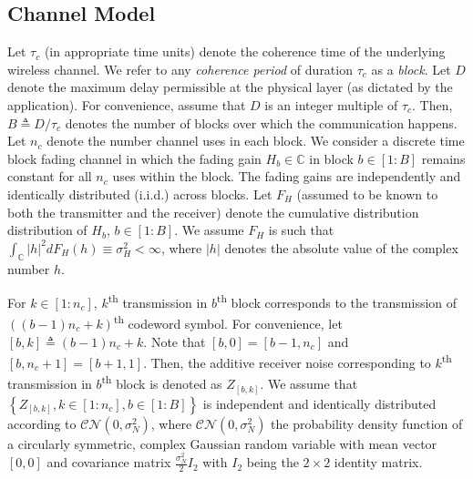 \documentclass[conference]{IEEEtran}
\begin{document}
\subsection{Channel Model}
Let $\tau_c$ (in appropriate time units) denote the coherence time of the underlying wireless channel. We refer to any \emph{coherence period} of duration $\tau_c$ as a \emph{block}. Let $D$ denote the maximum delay permissible at the physical layer (as dictated by the application). For convenience, assume that $D$ is an integer multiple of $\tau_c$. Then, $B\triangleq D/\tau_c$ denotes the number of blocks over which the communication happens.   Let $n_c$ denote the number channel uses in each block. We consider a discrete time block fading channel in which the fading gain $H_b\in\mathbb{C}$ in block $b\in[1:B]$ remains constant for all $n_c$ uses within the block. The fading gains are independently and identically distributed (i.i.d.) across blocks.  Let $F_{H}$ (assumed to be known to both the transmitter and the receiver) denote the cumulative distribution distribution of $H_b$, $b\in[1:B]$. We assume $F_{H}$ is such that $\int_{\mathbb{C}}|h|^2dF_H(h)\equiv \sigma_H^2<\infty$, where $|h|$ denotes the absolute value of the complex number $h$. 
\par For $k\in[1:n_c]$, $k$\textsuperscript{th} transmission in $b$\textsuperscript{th} block corresponds to the transmission of $\left((b-1)n_c+k\right)$\textsuperscript{th} codeword symbol. For convenience, let $[b, k]\triangleq (b-1)n_c+k$. Note that $[b, 0] = [b-1, n_c]$ and $[b, n_c+1] = [b+1, 1]$. Then, the additive receiver noise corresponding   to $k$\textsuperscript{th} transmission in $b$\textsuperscript{th} block is denoted as $Z_{[b,k]}$. We assume that $\left\{Z_{[b,k]},k\in[1:n_c],b\in[1:B]\right\}$ is independent and identically distributed according to $\mathcal{C}\mathcal{N}\left(0,\sigma_N^2\right)$, where $\mathcal{C}\mathcal{N}\left(0,\sigma_N^2\right)$ the probability density function of a circularly symmetric, complex Gaussian random variable  with mean vector $[0,0]$ and covariance matrix $\frac{\sigma_N^2}{2}I_2$ with $I_2$ being the $2\times 2$ identity matrix.
\end{document}
